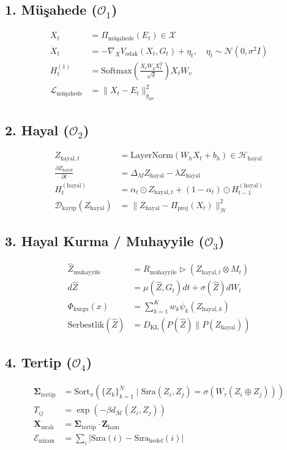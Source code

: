 \documentclass[11pt, a4paper]{article}
\begin{document}
\subsection{1. Müşahede ($\mathcal{O}_1$)}
\begin{align}
X_t &= \Pi_{\text{müşahede}}(E_t) \in \mathcal{X} \\
\dot{X}_t &= -\nabla_{X} V_{\text{odak}}(X_t, G_t) + \eta_t, \quad \eta_t \sim \mathcal{N}(0, \sigma^2 I) \\
H_t^{(1)} &= \text{Softmax}\left(\frac{X_t W_q X_t^T}{\sqrt{d}}\right) X_t W_v \\
\mathcal{L}_{\text{müşahede}} &= \| X_t - E_t \|_{g_{\mu\nu}}^2
\end{align}

\subsection{2. Hayal ($\mathcal{O}_2$)}
\begin{align}
Z_{\text{hayal}, t} &= \text{LayerNorm}(W_h X_t + b_h) \in \mathcal{H}_{\text{hayal}} \\
\frac{\partial Z_{\text{hayal}}}{\partial t} &= \Delta_M Z_{\text{hayal}} - \lambda Z_{\text{hayal}} \\
H_t^{(\text{hayal})} &= \alpha_t \odot Z_{\text{hayal}, t} + (1-\alpha_t) \odot H_{t-1}^{(\text{hayal})} \\
\mathcal{D}_{\text{kayıp}}(Z_{\text{hayal}}) &= \| Z_{\text{hayal}} - \Pi_{\text{proj}}(X_t) \|_{\mathcal{H}}^2
\end{align}

\subsection{3. Hayal Kurma / Muhayyile ($\mathcal{O}_3$)}
\begin{align}
\hat{Z}_{\text{muhayyile}} &= R_{\text{muhayyile}} \triangleright \left( Z_{\text{hayal}, t} \otimes M_t \right) \\
d\hat{Z} &= \mu(\hat{Z}, G_t)dt + \sigma(\hat{Z}) dW_t \\
\Phi_{\text{kurgu}}(x) &= \sum_{k=1}^K w_k \psi_k(Z_{\text{hayal}, k}) \\
\text{Serbestlik}(\hat{Z}) &= D_{\text{KL}}\left(P(\hat{Z}) \parallel P(Z_{\text{hayal}})\right)
\end{align}

\subsection{4. Tertip ($\mathcal{O}_4$)}
\begin{align}
\mathbf{\Sigma}_{\text{tertip}} &= \text{Sort}_{\pi}\left( \{Z_k\}_{k=1}^N \mid \text{Sıra}(Z_i, Z_j) = \sigma(W_\tau (Z_i \oplus Z_j)) \right) \\
T_{ij} &= \exp\left( -\beta d_{\mathcal{M}}(Z_i, Z_j) \right) \\
\mathbf{X}_{\text{sıralı}} &= \mathbf{\Sigma}_{\text{tertip}} \cdot \mathbf{Z}_{\text{ham}} \\
\mathcal{E}_{\text{nizam}} &= \sum_{i} |\text{Sıra}(i) - \text{Sıra}_{\text{hedef}}(i)|
\end{align}
\end{document}
